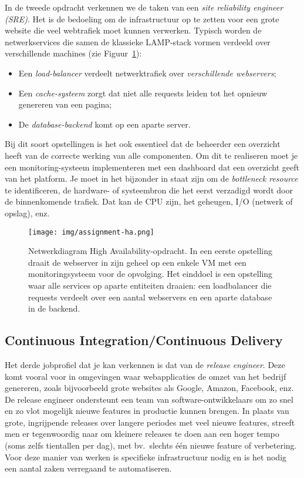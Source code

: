 In de tweede opdracht verkennen we de taken van een \textit{site reliability engineer (SRE)}. Het is de bedoeling om de infrastructuur op te zetten voor een grote website die veel webtrafiek moet kunnen verwerken. Typisch worden de netwerkservices die samen de klassieke LAMP-stack vormen verdeeld over verschillende machines (zie Figuur~\ref{fig:ha}):

\begin{itemize}
\item Een \textit{load-balancer} verdeelt netwerktrafiek over \textit{verschillende webservers};
\item Een \textit{cache-systeem} zorgt dat niet alle requests leiden tot het opnieuw genereren van een pagina;
\item De \textit{database-backend} komt op een aparte server.
\end{itemize}

Bij dit soort opstellingen is het ook essentieel dat de beheerder een overzicht heeft van de correcte werking van alle componenten. Om dit te realiseren moet je een monitoring-systeem implementeren met een dashboard dat een overzicht geeft van het platform. Je moet in het bijzonder in staat zijn om de \textit{bottleneck resource} te identificeren, de hardware- of systeembron die het eerst verzadigd wordt door de binnenkomende trafiek. Dat kan de CPU zijn, het geheugen, I/O (netwerk of opslag), enz.

\begin{figure}
  \centering
  \texttt{[image: img/assignment-ha.png]}
  \caption[Netwerkdiagram High Availability-opdracht]{Netwerkdiagram High Availability-opdracht. In een eerste opstelling draait de webserver in zijn geheel op een enkele VM met een monitoringsysteem voor de opvolging. Het einddoel is een opstelling waar alle services op aparte entiteiten draaien: een loadbalancer die requests verdeelt over een aantal webservers en een aparte database in de backend.}%
  \label{fig:ha}
\end{figure}

\subsection{Continuous Integration/Continuous Delivery}%
\label{subs:continuous-delivery}

Het derde jobprofiel dat je kan verkennen is dat van de \textit{release engineer}. Deze komt vooral voor in omgevingen waar webapplicaties de omzet van het bedrijf genereren, zoals bijvoorbeeld grote websites als Google, Amazon, Facebook, enz. De release engineer ondersteunt een team van software-ontwikkelaars om zo snel en zo vlot mogelijk nieuwe features in productie kunnen brengen. In plaats van grote, ingrijpende releases over langere periodes met veel nieuwe features, streeft men er tegenwoordig naar om kleinere releases te doen aan een hoger tempo (soms zelfs tientallen per dag), met bv.~slechts één nieuwe feature of verbetering. Voor deze manier van werken is specifieke infrastructuur nodig en is het nodig een aantal zaken verregaand te automatiseren.

